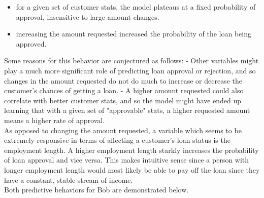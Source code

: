 \documentclass[11pt]{article}
\providecommand{\tightlist}{%
      \setlength{\itemsep}{0pt}\setlength{\parskip}{0pt}}
\begin{document}
\begin{itemize}
\tightlist
\item
  for a given set of customer stats, the model plateaus at a fixed
  probability of approval, insensitive to large amount changes.
\item
  increasing the amount requested increased the probability of the loan
  being approved.
\end{itemize}

Some reasons for this behavior are conjectured as follows: - Other
variables might play a much more significant role of predicting loan
approval or rejection, and so changes in the amount requested do not do
much to increase or decrease the customer's chances of getting a loan. -
A higher amount requested could also correlate with better customer
stats, and so the model might have ended up learning that with a given
set of "approvable" stats, a higher requested amount means a higher rate
of approval.\\

As opposed to changing the amount requested, a variable which seems to
be extremely responsive in terms of affecting a customer's loan status
is the employment length. A higher employment length starkly increases
the probability of loan approval and vice versa. This makes intuitive
sense since a person with longer employment length would most likely be
able to pay off the loan since they have a constant, stable stream of
income.\\

Both predictive behaviors for Bob are demonstrated below.
\end{document}
